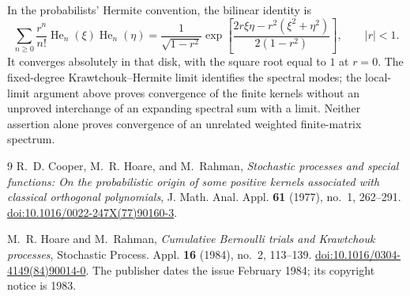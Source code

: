 \documentclass[11pt,reqno]{amsart}
\begin{document}
In the probabilists' Hermite convention,
the bilinear identity is
\[
\sum_{n\ge0}\frac{r^n}{n!}\operatorname{He}_n(\xi)
\operatorname{He}_n(\eta)
=\frac1{\sqrt{1-r^2}}
\exp\left[\frac{2r\xi\eta-r^2(\xi^2+\eta^2)}{2(1-r^2)}\right],
\qquad |r|<1.
\]
It converges absolutely in that disk, with the square root equal to
$1$ at $r=0$. The fixed-degree Krawtchouk--Hermite limit identifies the
spectral modes; the local-limit argument above proves convergence of
the finite kernels without an unproved interchange of an expanding
spectral sum with a limit. Neither assertion alone proves convergence
of an unrelated weighted finite-matrix spectrum.

\begin{thebibliography}{9}
R.~D. Cooper, M.~R. Hoare, and M.~Rahman,
\emph{Stochastic processes and special functions: On the probabilistic
origin of some positive kernels associated with classical orthogonal
polynomials}, J. Math. Anal. Appl. \textbf{61} (1977), no.~1, 262--291.
\href{https://doi.org/10.1016/0022-247X(77)90160-3}{doi:10.1016/0022-247X(77)90160-3}.

M.~R. Hoare and M.~Rahman, \emph{Cumulative Bernoulli trials and
Krawtchouk processes}, Stochastic Process. Appl. \textbf{16} (1984),
no.~2, 113--139.
\href{https://doi.org/10.1016/0304-4149(84)90014-0}{doi:10.1016/0304-4149(84)90014-0}.
The publisher dates the issue February 1984; its copyright notice is 1983.

\end{thebibliography}
\end{document}
